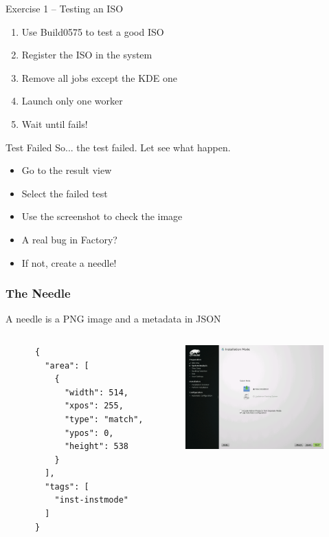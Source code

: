 \documentclass{beamer}
\begin{document}
%
%
\begin{frame}{Exercise 1 -- Testing an ISO}
  \begin{enumerate}
  \item Use Build0575 to test a good ISO
  \item Register the ISO in the system
  \item Remove all jobs except the KDE one
  \item Launch only one worker
  \item Wait until fails!
  \end{enumerate}
\end{frame}

%
%
\begin{frame}{Test Failed}
  So... the test failed. Let see what happen.
  \begin{itemize}
  \item Go to the result view
  \item Select the failed test
  \item Use the screenshot to check the image
  \item A real bug in Factory?
  \item If not, create a needle!
  \end{itemize}
\end{frame}

%
%
\begin{frame}[fragile]
  \frametitle{The Needle}
  A needle is a PNG image and a metadata in JSON
  \begin{columns}
    \begin{column}{0.45\textwidth}
    \lstset{style=mybash}
    \begin{lstlisting}
      {
        "area": [
          {
            "width": 514,
            "xpos": 255,
            "type": "match",
            "ypos": 0,
            "height": 538
          }
        ],
        "tags": [
          "inst-instmode"
        ]
      }
    \end{lstlisting}
    \end{column}

    \begin{column}{0.45\textwidth}
      \includegraphics[height=4cm,width=5.33cm]{needle}
    \end{column}
  \end{columns}
\end{frame}
\end{document}
